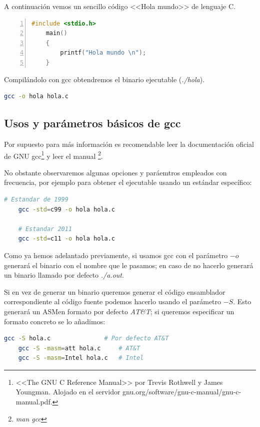 \documentclass[a4paper, 11pt, titlepage]{article}
\begin{document}
    A continuación vemos un sencillo código <<Hola mundo>> de lenguaje C.

    \begin{lstlisting}[language=C,numbers=left]
    #include <stdio.h>
    main()
    {
        printf("Hola mundo \n");
    }\end{lstlisting}

    Compilándolo con gcc obtendremos el binario ejecutable (\textit{./hola}).
    
    \begin{lstlisting}[language=bash]
    gcc -o hola hola.c\end{lstlisting}
        
    \subsection{Usos y parámetros básicos de gcc}

        Por supuesto para más información es recomendable leer la documentación oficial de GNU gcc\footnote{
            <<The GNU C Reference Manual>> por Trevis Rothwell y James Youngman. Alojado en el 
            servidor gnu.org/software/gnu-c-manual/gnu-c-manual.pdf.
        } y leer el manual \footnote{
            \textit{man gcc}
        }.

        No obstante observaremos algunas opciones y paráemtros empleados con frecuencia, por ejemplo para obtener 
        el ejecutable usando un estándar específico:

        \begin{lstlisting}[language=bash]
    # Estandar de 1999
    gcc -std=c99 -o hola hola.c

    # Estandar 2011
    gcc -std=c11 -o hola hola.c\end{lstlisting}

        Como ya hemos adelantado previamente, si usamos gcc con el parámetro $-o$ generará el binario con el nombre
        que le pasamos; en caso de no hacerlo generará un binario llamado por defecto \textit{./a.out}. 
        
        Si en vez de generar un binario queremos generar el código ensamblador correspondiente al código fuente 
        podemos hacerlo usando el parámetro $-S$. Esto generará un ASMen formato por defecto \textit{AT\&T}; si queremos
        especificar un formato concreto se lo añadimos:

        \begin{lstlisting}[language=bash]
    gcc -S hola.c               # Por defecto AT&T
    gcc -S -masm=att hola.c     # AT&T
    gcc -S -masm=Intel hola.c   # Intel\end{lstlisting}
\end{document}
